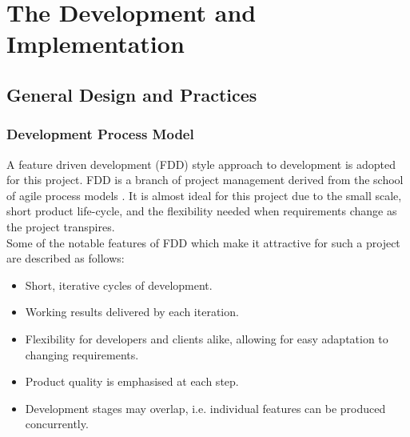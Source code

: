 \chapter{The Development and Implementation}

\section{General Design and Practices}

\subsection*{Development Process Model}

A feature driven development (FDD) style approach to development is adopted for this project. 
FDD is a branch of project management derived from the school of agile process models \cite{pracguidefdd}. 
It is almost ideal for this project due to the small scale,  short product life-cycle,
and the flexibility needed when requirements change as the project transpires.
\\



Some of the notable features of FDD which make it attractive for such a project are described 
as follows:

\begin{itemize}
\item Short, iterative cycles of development.
\item Working results delivered by each iteration.
\item Flexibility for developers and clients alike, allowing for easy adaptation to changing requirements.
\item Product quality is emphasised at each step. 
\item Development stages may overlap, i.e. individual features can be produced concurrently.
\end{itemize}


